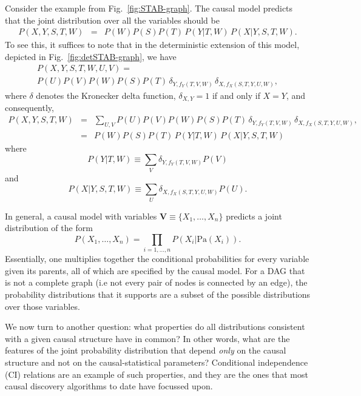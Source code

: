 \documentclass[12pt,onecolumn,nofootinbib]{revtex4-2}
\begin{document}
Consider the example from Fig.~\ref{fig:STAB-graph}.  The causal
model predicts that the joint distribution over all the variables should be
\begin{eqnarray}
P(X,Y,S,T,W)&=& P\left( W \right) P\left( S\right) P(T)\,P(Y|T,W)\,P(X|Y,S,T,W). \label{eq:exdist}
\end{eqnarray}
 To see this, it suffices to note that in the deterministic extension of this model, depicted in Fig.~\ref{fig:detSTAB-graph}, we have
\begin{multline}
P(X,Y,S,T,W,U,V) = \\
P\left(U\right) P\left( V \right) P\left( W \right) P\left( S\right) P(T)\, \delta_{Y,f_Y(T,V,W)} \, \delta_{X,f_X(S,T,Y,U,W)}, \label{eq:exdist}
\end{multline}
where $\delta$ denotes the Kronecker delta function, $\delta_{X,Y}=1$ if and only if $X=Y$, and consequently,
\begin{eqnarray}
P(X,Y,S,T,W)&=& \sum_{U,V} P\left(U\right) P\left( V \right) P\left( W \right) P\left( S\right) P(T)\, \delta_{Y,f_Y(T,V,W)} \, \delta_{X,f_X(S,T,Y,U,W)}, \nonumber\\
&=&P\left( W \right) P\left( S\right) P(T)\,P(Y|T,W)\,P(X|Y,S,T,W)\,
\label{eq:exdist}
\end{eqnarray}
where $$P(Y|T,W)\equiv \sum_V \delta_{Y,f_Y(T,V,W)} P\left(V\right) $$ and $$P(X|Y,S,T,W)\equiv \sum_U \delta_{X,f_X(S,T,Y,U,W)} P(U).$$
\color{black}

In general, a causal model with variables $\mathbf{V}\equiv \{ X_1,\dots,X_n\}$ predicts a joint distribution of the form
\begin{equation} \label{eq:jointdistribution}
P(X_1,\dots,X_n) = \prod_{i=1,\dots,n} P(X_i|\text{Pa}(X_i)).
\end{equation}
Essentially, one multiplies together the conditional probabilities for every
variable given its parents, all of which are specified by the causal model.
For a DAG that is not a complete graph (i.e not every pair of nodes is connected by an edge), the probability distributions that it supports are a subset of the possible distributions over those variables.

We now turn to another question: what properties do all distributions consistent with a given causal structure have in common?  In other words, what are the features of the joint probability distribution that depend \emph{only} on the causal structure and not on the causal-statistical parameters?  Conditional independence (CI) relations are an example of such properties, and they are the ones that most causal discovery algorithms to date have focussed upon.
\end{document}
